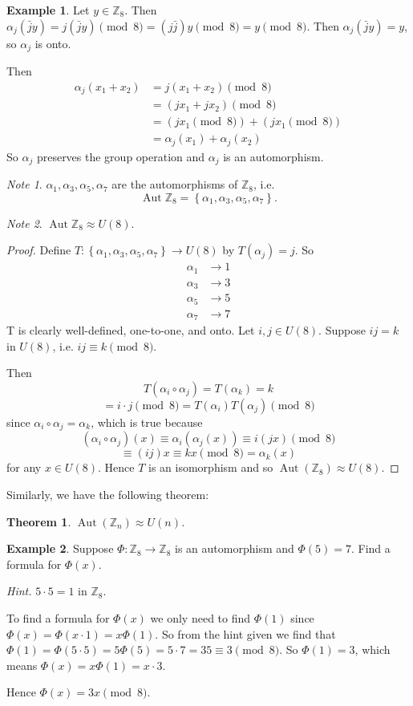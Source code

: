 \documentclass[11pt]{article}
\newcommand{\br}[1]{\left(#1\right)}
\newcommand{\cbr}[1]{\left\{#1\right\}}
\DeclareMathOperator\Aut{Aut}
\newtheorem{theorem}{Theorem}[section]
\theoremstyle{remark}
\newtheorem*{note}{Note}
\theoremstyle{definition}
\theoremstyle{remark}
\theoremstyle{definition}
\newtheorem*{example}{Example}
\theoremstyle{remark}
\begin{document}
\begin{example}
  Let $y\in\mathbb{Z}_8$. Then $\alpha_j(\bar{j}y) = j\br{\bar{j}y} \pmod{8} = \br{j\bar{j}}y \pmod{8} = y \pmod{8}$. Then $\alpha_j(\bar{j}y) = y$, so $\alpha_j$ is onto.

  Then \begin{align*}
    \alpha_j(x_1+x_2) &= j(x_1+x_2) \pmod{8} \\
    &= \br{jx_1+jx_2}\pmod{8}\\
    &= \br{jx_1\pmod{8}} + \br{jx_1\pmod{8}} \\
    &= \alpha_j(x_1) + \alpha_j(x_2)
  \end{align*}
  So $\alpha_j$ preserves the group operation and $\alpha_j$ is an automorphism.
  \begin{note}
    $\alpha_1, \alpha_3, \alpha_5, \alpha_7$ are the automorphisms of $\mathbb{Z}_8$, i.e. $$\Aut{\mathbb{Z}_8} = \cbr{\alpha_1, \alpha_3, \alpha_5, \alpha_7}.$$
  \end{note}
\end{example}

\begin{note}
  $\Aut{\mathbb{Z}_8} \approx U(8)$.
\end{note}
\begin{proof}
  Define $T : \cbr{\alpha_1, \alpha_3, \alpha_5, \alpha_7} \to U(8)$ by $T(\alpha_j) = j$. So \begin{align*}
    \alpha_1 &\to 1 \\
    \alpha_3 &\to 3 \\
    \alpha_5 &\to 5 \\
    \alpha_7 &\to 7 
  \end{align*}
  T is clearly well-defined, one-to-one, and onto. Let $i,j\in U(8)$. Suppose $ij=k$ in $U(8)$, i.e. $ij \equiv k \pmod{8}$.

  Then $$T(\alpha_i\circ \alpha_j) = T(\alpha_k) = k$$ $$= i\cdot j \pmod{8} = T(\alpha_i)T(\alpha_j)\pmod{8}$$ since $\alpha_i\circ\alpha_j = \alpha_k$, which is true because $$(\alpha_i\circ\alpha_j)(x) \equiv \alpha_i(\alpha_j(x)) \equiv i(jx) \pmod{8}$$ $$\equiv (ij)x \equiv kx \pmod{8} = \alpha_k(x)$$ for any $x\in U(8)$. Hence $T$ is an isomorphism and so $\Aut(\mathbb{Z}_8)\approx U(8)$. 
\end{proof}

Similarly, we have the following theorem:
\begin{theorem}
  $\Aut(\mathbb{Z}_n)\approx U(n)$.
\end{theorem}

\begin{example}
  Suppose $\Phi : \mathbb{Z}_8 \to \mathbb{Z}_8$ is an automorphism and $\Phi(5) = 7$. Find a formula for $\Phi(x)$.

  \textit{Hint.} $5\cdot5 = 1$ in $\mathbb{Z}_8$.

  To find a formula for $\Phi(x)$ we only need to find $\Phi(1)$ since $\Phi(x) = \Phi(x\cdot 1) = x\Phi(1)$. So from the hint given we find that $\Phi(1) = \Phi(5\cdot 5) = 5\Phi(5) = 5\cdot 7 = 35 \equiv 3 \pmod{8}$. So $\Phi(1) = 3$, which means $\Phi(x) = x\Phi(1) = x\cdot3$.

  Hence $\Phi(x) = 3x \pmod{8}$.
\end{example}
\end{document}
